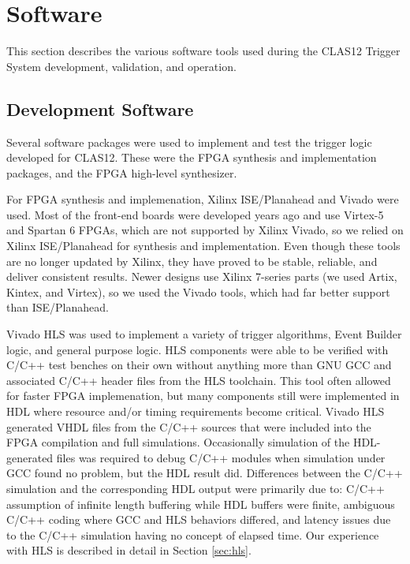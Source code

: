 \section{Software}

This section describes the various software tools used during the CLAS12 Trigger System development, validation, and operation.

\subsection{Development Software}

Several software packages were used to implement and test the trigger logic developed for CLAS12. These were the FPGA synthesis and implementation packages, and the FPGA high-level synthesizer.

For FPGA synthesis and implemenation, Xilinx ISE/Planahead and Vivado were used. Most of the front-end boards were developed years ago and use Virtex-5 and Spartan 6 FPGAs, which are not supported by Xilinx Vivado, so we relied on Xilinx ISE/Planahead for synthesis and implementation. Even though these tools are no longer updated by Xilinx, they have proved to be stable, reliable, and deliver consistent results. Newer designs use Xilinx 7-series parts (we used Artix, Kintex, and Virtex), so we used the Vivado tools, which had far better support than ISE/Planahead.

Vivado HLS was used to implement a variety of trigger algorithms, Event Builder logic, and general purpose logic. HLS components were able to be verified with C/C++ test benches on their own without anything more than GNU GCC and associated C/C++ header files from the HLS toolchain. This tool often allowed for faster FPGA implemenation, but many components still were implemented in HDL where resource and/or timing requirements become critical. Vivado HLS generated VHDL files from the C/C++ sources that were included into the FPGA compilation and full simulations. Occasionally simulation of the HDL-generated files was required to debug C/C++ modules when simulation under GCC found no problem, but the HDL result did. Differences between the C/C++ simulation and the corresponding HDL output were primarily due to: C/C++ assumption of infinite length buffering while HDL buffers were finite, ambiguous C/C++ coding where GCC and HLS behaviors differed, and latency issues due to the C/C++ simulation having no concept of elapsed time. Our experience with HLS is described in detail in Section \ref{sec:hls}.

